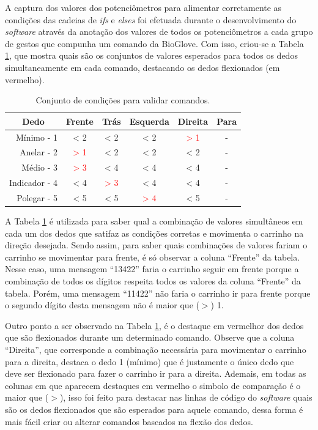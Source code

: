 \documentclass[
	12pt,				%
	openright,			%
	oneside,			%
	a4paper,			%
	english,			%
	brazil				%
	]{abntex2}
\begin{document}
		A captura dos valores dos potenciômetros para alimentar corretamente as condições das cadeias de \textit{ifs} e \textit{elses} foi efetuada durante o desenvolvimento do \textit{software} através da anotação dos valores de todos os potenciômetros a cada grupo de gestos que compunha um comando da BioGlove. Com isso, criou-se a Tabela \ref{Tab:dedos-e-comandos1}, que mostra quais são os conjuntos de valores esperados para todos os dedos simultaneamente em cada comando, destacando os dedos flexionados (em vermelho). 
		
\begin{table}[H]
	\centering
  \caption{Conjunto de condições para validar comandos.}
  \begin{tabular}{r|ccccc}
		\midrule
\multicolumn{1}{c|}{Dedo} 					&       Frente			 & 				Trás				& 		Esquerda			 & 		Direita					& Para	\\
			 \midrule
			 Mínimo - 1    		& < 2   						 & < 2   							& < 2    						 &\textcolor{red}{> 1}&	-			\\
			 Anelar - 2    		&\textcolor{red}{> 1}& < 2   							& < 2  	 						 & < 2   							&	-			\\
			 Médio - 3    		&\textcolor{red}{> 3}& < 4   							& < 4   						 & < 4   							&	-			\\
			 Indicador - 4    & < 4   						 &\textcolor{red}{> 3}& < 4 							 & < 4   							&	-			\\
			 Polegar - 5    	& < 5   						 & < 5   							&\textcolor{red}{> 4}& < 5   							&	-			\\
		 \midrule
	\end{tabular}
  \label{Tab:dedos-e-comandos1}
  \end{table}

		A Tabela \ref{Tab:dedos-e-comandos1} é utilizada para saber qual a combinação de valores simultâneos em cada um dos dedos que satifaz as condições corretas e movimenta o carrinho na direção desejada. Sendo assim, para saber quais combinações de valores fariam o carrinho se movimentar para frente, é só observar a coluna ``Frente'' da tabela. Nesse caso, uma mensagem ``13422'' faria o carrinho seguir em frente porque a combinação de todos os dígitos respeita todos os valores da coluna ``Frente'' da tabela. Porém, uma mensagem ``11422'' não faria o carrinho ir para frente porque o segundo dígito desta mensagem não é maior que ($>$) 1.

		Outro ponto a ser observado na Tabela \ref{Tab:dedos-e-comandos1}, é o destaque em vermelhor dos dedos que são flexionados durante um determinado comando. Observe que a coluna ``Direita'', que corresponde a combinação necessária para movimentar o carrinho para a direita, destaca o dedo 1 (mínimo) que é justamente o único dedo que deve ser flexionado para fazer o carrinho ir para a direita. Ademais, em todas as colunas em que aparecem destaques em vermelho o simbolo de comparação é o maior que ($>$), isso foi feito para destacar nas linhas de código do \textit{software} quais são os dedos flexionados que são esperados para aquele comando, dessa forma é mais fácil criar ou alterar comandos baseados na flexão dos dedos.
\end{document}

